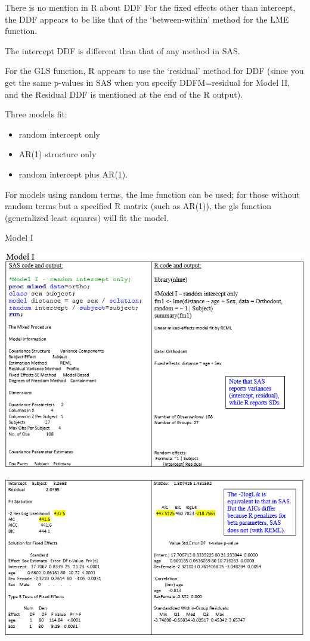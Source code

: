 \documentclass[
  9pt,
  ignorenonframetext,
]{beamer}
\begin{document}
\begin{frame}{There is no mention in R about DDF}
\protect\hypertarget{there-is-no-mention-in-r-about-ddf}{}
For the fixed effects other than intercept, the DDF appears to be like
that of the `between-within' method for the LME function.

The intercept DDF is different than that of any method in SAS.

For the GLS function, R appears to use the `residual' method for DDF
(since you get the same p-values in SAS when you specify DDFM=residual
for Model II, and the Residual DDF is mentioned at the end of the R
output).
\end{frame}

\begin{frame}{}
\protect\hypertarget{section-1}{}
Three models fit:

\begin{itemize}
\item
  random intercept only
\item
  AR(1) structure only
\item
  random intercept plus AR(1).
\end{itemize}

For models using random terms, the lme function can be used; for those
without random terms but a specified R matrix (such as AR(1)), the gls
function (generalized least squares) will fit the model.
\end{frame}

\begin{frame}{Model I}
\protect\hypertarget{model-i}{}
\begin{center}\includegraphics[width=0.7\linewidth]{figs_L9/f2} \end{center}

\begin{center}\includegraphics[width=0.7\linewidth]{figs_L9/f3} \end{center}
\end{frame}
\end{document}
